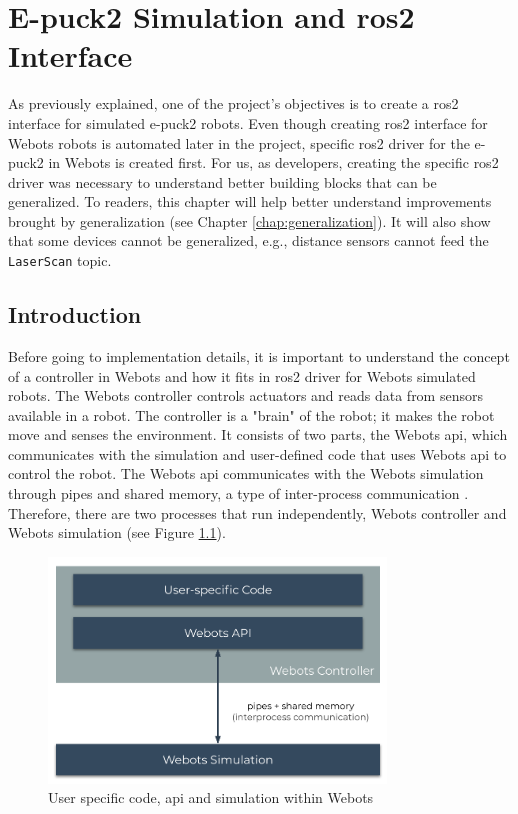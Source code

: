 \chapter{E-puck2 Simulation and \acs{ros2} Interface}
\label{chap:simulation}

As previously explained, one of the project's objectives is to create a \ac{ros2} interface for simulated e-puck2 robots.
Even though creating \ac{ros2} interface for Webots robots is automated later in the project, specific \ac{ros2} driver for the e-puck2 in Webots is created first.
For us, as developers, creating the specific \ac{ros2} driver was necessary to understand better building blocks that can be generalized.
To readers, this chapter will help better understand improvements brought by generalization (see Chapter \ref{chap:generalization}).
It will also show that some devices cannot be generalized, e.g., distance sensors cannot feed the \texttt{LaserScan} topic.

\section{Introduction}

Before going to implementation details, it is important to understand the concept of a controller in Webots and how it fits in \ac{ros2} driver for Webots simulated robots.
The Webots controller controls actuators and reads data from sensors available in a robot.
The controller is a "brain" of the robot; it makes the robot move and senses the environment.
It consists of two parts, the Webots \ac{api}, which communicates with the simulation and user-defined code that uses Webots \ac{api} to control the robot.
The Webots \ac{api} communicates with the Webots simulation through pipes and shared memory, a type of inter-process communication \cite{kashyian_portable_2008}.
Therefore, there are two processes that run independently, Webots controller and Webots simulation (see Figure \ref{fig:simulation:webots_user_code_and_api}).

\begin{figure}[H]
    \centering
    \includegraphics[width=0.8\textwidth]{simulation/figures/webots_user_code_and_api.pdf}
    \caption{User specific code, \ac{api} and simulation within Webots}
    \label{fig:simulation:webots_user_code_and_api}
\end{figure}

